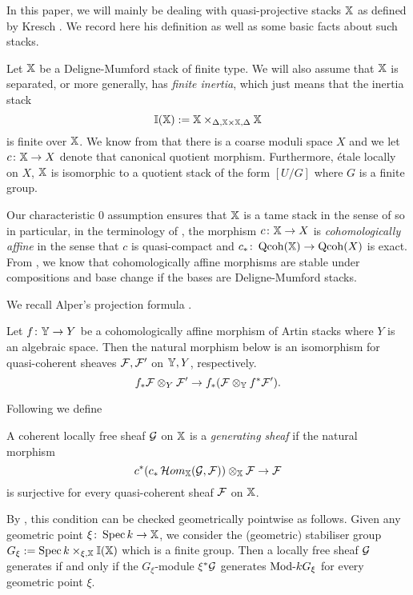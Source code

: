 \documentclass[12pt]{amsart}
\begin{document}
In this paper, we will mainly be dealing with quasi-projective stacks $\mathbb{X}$ as defined by Kresch \cite{Kr}. We record here his definition as well as some basic facts about such stacks.

Let $\mathbb{X}$ be a Deligne-Mumford stack of finite type. We will also assume that $\mathbb{X}$ is separated, or more generally, has {\em finite inertia}, which just means that the inertia stack $$\mathbb{I}(\mathbb{X}) :=\mathbb{X} \times_{\Delta,\mathbb{X} \times \mathbb{X} , \Delta} \mathbb{X}$$ 
is finite over $\mathbb{X}$. We know from \cite{KeM} that there is a coarse moduli space $X$ and we let $c\colon \mathbb{X} \to X$ denote that canonical quotient morphism. Furthermore, \'etale locally on $X$, $\mathbb{X}$ is isomorphic to a quotient stack of the form $[U/G]$ where $G$ is a finite group.

Our characteristic 0 assumption ensures that $\mathbb{X}$ is a tame stack in the sense of \cite{AOV} so in particular, in the terminology of \cite[Definition~3.1]{Alp}, the morphism $c \colon \mathbb{X} \to X$ is {\em cohomologically affine} in the sense that $c$ is quasi-compact and $c_* \colon \operatorname{Qcoh}(\mathbb{X}) \to \operatorname{Qcoh} (X)$ is exact.  From \cite[Proposition~3.10]{Alp}, we know that cohomologically affine morphisms are stable under compositions and base change if the bases are Deligne-Mumford stacks. 

We recall Alper's projection formula \cite[Proposition~4.5]{Alp}.
\begin{proposition}   \label{prop:projection}
Let $f \colon \mathbb{Y} \to Y$ be a cohomologically affine morphism of Artin stacks where $Y$ is an algebraic space. Then the natural morphism below is an isomorphism for quasi-coherent sheaves $\mathcal{F}, \mathcal{F}'$ on $\mathbb{Y}, Y$, respectively.
$$ f_* \mathcal{F} \otimes_{Y} \mathcal{F}' \to f_* (\mathcal{F} \otimes_{\mathbb{Y}} f^* \mathcal{F}').$$
\end{proposition}

Following \cite{OS} we define
\begin{definition}
A coherent locally free sheaf $\mathcal{G}$ on $\mathbb{X}$ is a {\em generating sheaf} if the natural morphism
$$ c^*(c_*\mathop{{\mathcal{H}}om}\nolimits_{\mathbb{X}}(\mathcal{G}, \mathcal{F})) \otimes_{\mathbb{X}} \mathcal{F} \to \mathcal{F}$$
is surjective for every quasi-coherent sheaf $\mathcal{F}$ on $\mathbb{X}$. 
\end{definition}
By \cite[Theorem~5.2]{OS}, this condition can be checked geometrically pointwise as follows. Given any geometric point $\xi \colon \operatorname{Spec} k \to \mathbb{X}$, we consider the (geometric) stabiliser group $G_{\xi} := \operatorname{Spec} k \times_{\xi, \mathbb{X}} \mathbb{I}(\mathbb{X})$ which is a finite group. Then a locally free sheaf $\mathcal{G}$ generates if and only if the $G_{\xi}$-module $\xi^* \mathcal{G}$ generates $\textup{Mod-} kG_{\xi}$ for every geometric point $\xi$. 
\end{document}
